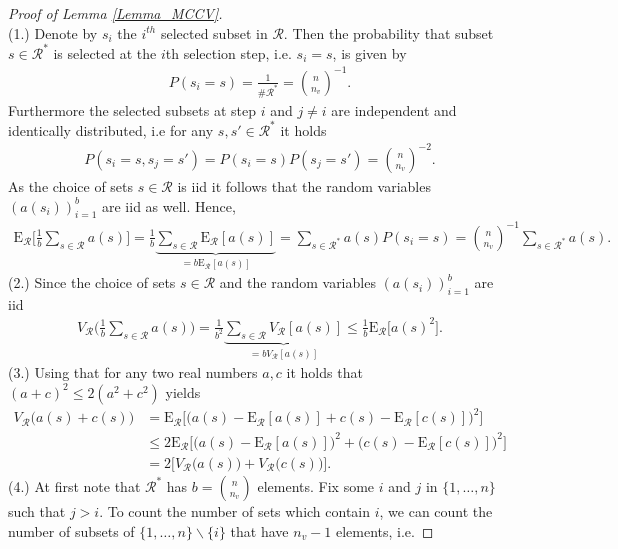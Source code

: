 \documentclass[Research_Module_ES.tex]{subfiles}
\begin{document}
\begin{proof}[Proof of Lemma \ref{Lemma_MCCV}]~\\
	(1.) Denote by $s_i$ the $i^{th}$ selected subset in $\mathcal{R}$. Then the probability that subset $s \in \mathcal{R}^\ast$ is selected at the $i$th selection step, i.e. $s_i=s$, is given by
	\begin{align*}
	P(s_i=s)= \frac{1}{\# \mathcal{R}^\ast} = \binom{n}{n_v}^{-1}.
	\end{align*}
	Furthermore the selected subsets at step $i$ and $j\neq i$ are independent and identically distributed, i.e for any $s,s'\in \mathcal{R}^\ast$ it holds
	\begin{align*}
	P(s_i=s,s_j=s')=P(s_i=s)P(s_j=s')=\binom{n}{n_v}^{-2}.
	\end{align*}
	As the choice of sets $s\in \mathcal{R}$ is iid it follows that the random variables $(a(s_i))_{i=1}^b$ are iid as well. Hence, 
	\begin{align*}
	\mathrm{E}_\mathcal{R} \biggl[ \frac{1}{b}\sum_{s\in \mathcal{R}}a(s)\biggr] 
	= \frac{1}{b}\underbrace{\sum_{s\in \mathcal{R}}\mathrm{E}_\mathcal{R} [a(s)]}_{=b\mathrm{E}_\mathcal{R}[a(s)]}
	= \sum_{s\in \mathcal{R}^\ast}a(s)P(s_i = s)
	=\binom{n}{n_v}^{-1}\sum_{s\in\mathcal{R}^\ast}a(s).
	\end{align*}
	(2.) Since the choice of sets $s\in \mathcal{R}$ and the random variables $(a(s_i))_{i=1}^b$ are iid
	\begin{align*}
	V_\mathcal{R} \biggl(\frac{1}{b}\sum_{s\in \mathcal{R}}a(s)\biggr)
	= \frac{1}{b^2}\underbrace{\sum_{s\in \mathcal{R}}V_\mathcal{R} [a(s)]}_{=bV_\mathcal{R} [a(s)]}
	\le \frac{1}{b}\mathrm{E}_\mathcal{R}\bigl[a(s)^2\bigr].
	\end{align*}
	(3.) Using that for any two real numbers $a,c$ it holds that $(a+c)^2\le 2(a^2+c^2)$ yields
	\begin{align*}
	V_\mathcal{R}\bigl(a(s)+c(s)\bigr) 
	&= \mathrm{E}_\mathcal{R}\bigl[\bigl(a(s)-\mathrm{E}_\mathcal{R}[a(s)] + c(s) - \mathrm{E}_\mathcal{R}[c(s)]\bigr)^2\bigr]\\
	&\le 2 \mathrm{E}_\mathcal{R}\bigl[\bigl(a(s)-\mathrm{E}_\mathcal{R}[a(s)] \bigr)^2+\bigl(c(s) - \mathrm{E}_\mathcal{R}[c(s)]\bigr)^2\bigr]\\
	&= 2\bigl[V_\mathcal{R}\bigl(a(s)\bigr)+V_\mathcal{R}\bigl(c(s)\bigr)\bigr]. 
	\end{align*}
	(4.) At first note that $\mathcal{R}^\ast$ has $b=\binom{n}{n_v}$ elements. Fix some $i$ and $j$ in $\{1,\dots, n\}$ such that $j>i$. To count the number of sets which contain $i$, we can count the number of subsets of $\{1,\dots, n\}\backslash\{i\}$ that have $n_v-1$ elements, i.e.

\end{proof}
\end{document}
